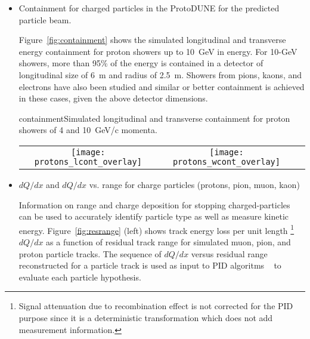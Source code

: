 \begin{itemize}
\item Containment for charged particles in the ProtoDUNE for the predicted particle beam. 

Figure~\ref{fig:containment} shows the simulated longitudinal and transverse 
energy containment for proton showers up to 10~GeV in energy.
For 10-GeV showers, more than 95\% of the energy is contained in a detector of longitudinal size of 6~m and 
radius of 2.5~m. Showers from pions, kaons, and electrons have also been studied and similar or better containment is achieved in these cases, given the above detector dimensions.


\begin{cdrfigure}{containment}{Simulated longitudinal and transverse containment for proton showers of 4 and 10~GeV/c momenta.}
  \begin{tabular}{ccc}
   \texttt{[image: protons\_lcont\_overlay]}&
   \texttt{[image: protons\_wcont\_overlay]}\\
  \end{tabular}
\end{cdrfigure}

\item $dQ/dx$ and $dQ/dx$ vs. range for charge particles (protons, pion, muon, kaon)


Information on range and charge deposition for stopping charged-particles can be used to accurately identify particle type as well as measure kinetic energy. Figure~\ref{fig:resrange}  (left) shows track energy loss per unit length \footnote{Signal attenuation due to recombination effect is not corrected for the PID purpose since it is a deterministic transformation which does not add measurement information.} $dQ/dx$ as a function of residual track range for simulated muon, pion, and proton particle tracks. The sequence of $dQ/dx$ versus residual range reconstructed for a particle track is used as input to PID algoritms ~\cite{nn_pid,rd_pid} to evaluate each particle hypothesis.


\end{itemize}
